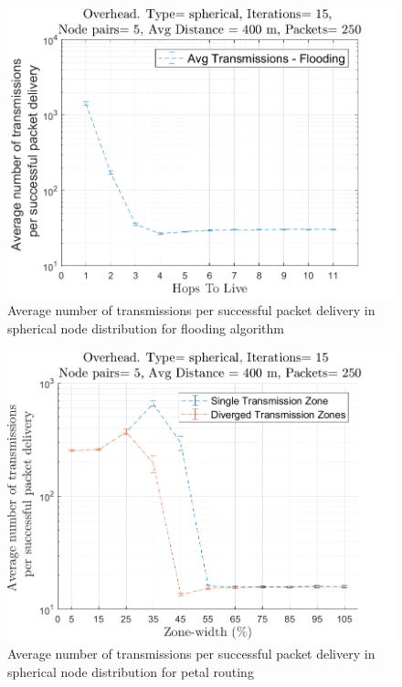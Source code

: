 \begin{figure}[hbtp]
\centering
\includegraphics[width=\simResultFigSize\textwidth,height=\textheight,keepaspectratio]{ncsuthesis-0.6/Chapter-5/figs/fl_trans_spherical.png}
\caption{Average number of transmissions per successful packet delivery in spherical node distribution for flooding algorithm}
\label{fig:fl_trans_spherical}
\end{figure}

\begin{figure}[hbtp]
\centering
\includegraphics[width=\simResultFigSize\textwidth,height=\textheight,keepaspectratio]{ncsuthesis-0.6/Chapter-5/figs/pe_trans_spherical.png}
\caption{Average number of transmissions per successful packet delivery in spherical node distribution for petal routing}
\label{fig:pe_trans_spherical}
\end{figure}

